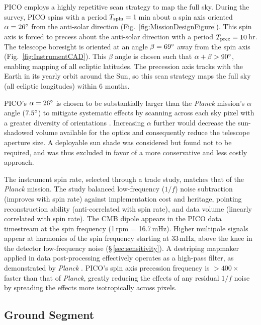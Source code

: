 PICO employs a highly repetitive scan strategy to map the full
sky. During the survey, PICO spins with a period
$T_{\rm spin} = 1$\,min about a spin axis oriented $\alpha=26^\circ$
from the anti-solar direction (Fig.~\ref{fig:MissionDesignFigure}). This spin axis
is forced to precess about the anti-solar direction with a period
$T_{\rm prec}= 10$\,hr. The telescope boresight is oriented at an
angle $\beta=69^\circ$ away from the spin axis (Fig.~\ref{fig:InstrumentCAD}). This $\beta$ angle is
chosen such that $\alpha + \beta > 90^\circ$, enabling mapping of all
ecliptic latitudes. The precession axis tracks with the Earth in its
yearly orbit around the Sun, so this scan strategy maps the full sky
(all ecliptic longitudes) within 6 months.

PICO's $\alpha=26^\circ$ is chosen to be substantially larger than
the \textit{Planck} mission's $\alpha$ angle ($7.5^\circ$) to
mitigate systematic effects by scanning across each sky pixel with a
greater diversity of orientations \citep{Hu2003}. Increasing $\alpha$
further would decrease the sun-shadowed volume available for the
optics and consequently reduce the telescope aperture size. A
deployable sun shade was considered but found not to be required, and
was thus excluded in favor of a more conservative and less costly
approach.

The instrument spin rate, selected through a trade study, matches that
of the \textit{Planck} mission. The study balanced low-frequency
($1/f$) noise subtraction (improves with spin rate) against
implementation cost and heritage, pointing reconstruction ability
(anti-correlated with spin rate), and data volume (linearly correlated
with spin rate).  The CMB dipole appears in the PICO data timestream
at the spin frequency (1\,rpm = 16.7\,mHz). Higher multipole signals
appear at harmonics of the spin frequency starting at 33\,mHz, above
the knee in the detector low-frequency noise
(\S\,\ref{sec:sensitivity}). A destriping mapmaker applied in data
post-processing effectively operates as a high-pass filter, as
demonstrated by \textit{Planck} \citep{Kurki-Suonio2009}. PICO's spin
axis precession frequency is $>400\times$ faster than that of
\textit{Planck}, greatly reducing the effects of any residual $1/f$
noise by spreading the effects more isotropically across pixels.

\subsection{Ground Segment}
\label{sec:ground_segment} %


